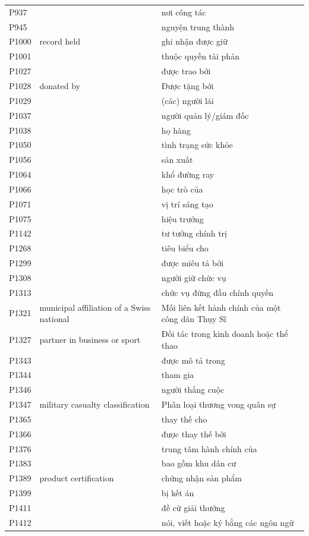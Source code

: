 \begin{center}
\begin{longtable}{p{1.6cm} p{5.2cm} p{5.2cm}}
P937 &  & nơi công tác \\
P945 &  & nguyện trung thành \\
P1000 & record held & ghi nhận được giữ \\
P1001 &  & thuộc quyền tài phán \\
P1027 &  & được trao bởi \\
P1028 & donated by & Được tặng bởi \\
P1029 &  & (các) người lái \\
P1037 &  & người quản lý/giám đốc \\
P1038 &  & họ hàng \\
P1050 &  & tình trạng sức khỏe \\
P1056 &  & sản xuất \\
P1064 &  & khổ đường ray \\
P1066 &  & học trò của \\
P1071 &  & vị trí sáng tạo \\
P1075 &  & hiệu trưởng \\
P1142 &  & tư tưởng chính trị \\
P1268 &  & tiêu biểu cho \\
P1299 &  & được miêu tả bởi \\
P1308 &  & người giữ chức vụ \\
P1313 &  & chức vụ đứng đầu chính quyền \\
P1321 & municipal affiliation of a Swiss national & Mối liên kết hành chính của một công dân Thụy Sĩ \\
P1327 & partner in business or sport & Đối tác trong kinh doanh hoặc thể thao \\
P1343 &  & được mô tả trong \\
P1344 &  & tham gia \\
P1346 &  & người thắng cuộc \\
P1347 & military casualty classification & Phân loại thương vong quân sự \\
P1365 &  & thay thế cho \\
P1366 &  & được thay thế bởi \\
P1376 &  & trung tâm hành chính của \\
P1383 &  & bao gồm khu dân cư \\
P1389 & product certification & chứng nhận sản phẩm \\
P1399 &  & bị kết án \\
P1411 &  & đề cử giải thưởng \\
P1412 &  & nói, viết hoặc ký bằng các ngôn ngữ \\

\end{longtable}
\end{center}
